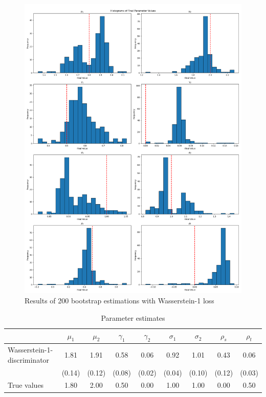 \begin{figure}
    \includegraphics[width=\textwidth]{./Images/main_case_histograms.png}
    \caption{Results of 200 bootstrap estimations with Wasserstein-1 loss}
    \label{fig:main_case_histrograms}
\end{figure}

\begin{table}
    \centering
    \begin{tabular}{lcccccccc} %
    \toprule
    & $\mu_1$ & $\mu_2$ & $\gamma_1$ & $\gamma_2$ & $\sigma_1$ & $\sigma_2$ & $\rho_s$ & $\rho_t$ \\
    \midrule
    Wasserstein-1-discriminator & 1.81 & 1.91 & 0.58 & 0.06 & 0.92 & 1.01 & 0.43 & 0.06 \\
    & (0.14) & (0.12) & (0.08) & (0.02) & (0.04) & (0.10) & (0.12) & (0.03) \\
    \midrule
    True values & 1.80 & 2.00 & 0.50 & 0.00 & 1.00 & 1.00 & 0.00 & 0.50 \\ 
    \bottomrule
    \end{tabular}
    \caption{Parameter estimates}
    \label{tab:table_I}
\end{table}

